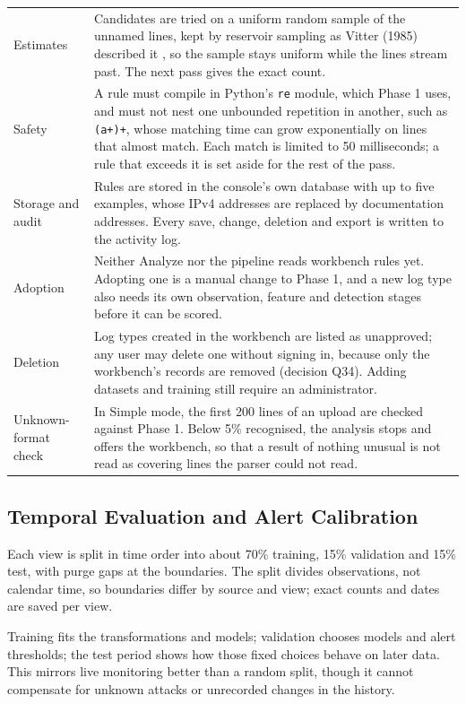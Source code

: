\documentclass[11pt,a4paper]{article}
\begin{document}
\begin{longtable}{>{\RaggedRight\arraybackslash}p{}>{\RaggedRight\arraybackslash}p{}}
Estimates & Candidates are tried on a uniform random sample of the unnamed lines, kept by reservoir sampling as Vitter (1985) described it \cite{ref12}, so the sample stays uniform while the lines stream past. The next pass gives the exact count. \\[3pt]
Safety & A rule must compile in Python's \nolinkurl{re} module, which Phase 1 uses, and must not nest one unbounded repetition in another, such as \nolinkurl{(a+)+}, whose matching time can grow exponentially on lines that almost match. Each match is limited to 50 milliseconds; a rule that exceeds it is set aside for the rest of the pass. \\[3pt]
Storage and audit & Rules are stored in the console's own database with up to five examples, whose IPv4 addresses are replaced by documentation addresses. Every save, change, deletion and export is written to the activity log. \\[3pt]
Adoption & Neither Analyze nor the pipeline reads workbench rules yet. Adopting one is a manual change to Phase 1, and a new log type also needs its own observation, feature and detection stages before it can be scored. \\[3pt]
Deletion & Log types created in the workbench are listed as unapproved; any user may delete one without signing in, because only the workbench's records are removed (decision Q34). Adding datasets and training still require an administrator. \\[3pt]
Unknown-format check & In Simple mode, the first 200 lines of an upload are checked against Phase 1. Below 5\% recognised, the analysis stops and offers the workbench, so that a result of nothing unusual is not read as covering lines the parser could not read. \\[3pt]
\end{longtable}
\endgroup

\subsection{Temporal Evaluation and Alert Calibration}\label{sec:temporal}

Each view is split in time order into about 70\% training, 15\% validation and 15\% test, with purge gaps at the boundaries. The split divides observations, not calendar time, so boundaries differ by source and view; exact counts and dates are saved per view.

Training fits the transformations and models; validation chooses models and alert thresholds; the test period shows how those fixed choices behave on later data. This mirrors live monitoring better than a random split, though it cannot compensate for unknown attacks or unrecorded changes in the history.
\end{document}
